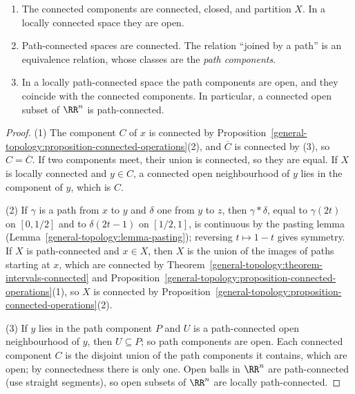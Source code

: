 \begin{proposition}\label{general-topology:proposition-components}
\begin{enumerate}
\item The connected components are connected, closed, and partition $X$. In a locally connected space they are open.
\item Path-connected spaces are connected. The relation ``joined by a path'' is an equivalence relation, whose classes are the \emph{path components}.
\item In a locally path-connected space the path components are open, and they coincide with the connected components. In particular, a connected
open subset of $\RR^n$ is path-connected.
\end{enumerate}
\end{proposition}

\begin{proof}
(1) The component $C$ of $x$ is connected by Proposition~\ref{general-topology:proposition-connected-operations}(2), and $\overline{C}$ is connected by
(3), so $C = \overline{C}$. If two components meet, their union is connected, so they are equal. If $X$ is locally connected and $y \in C$, a connected
open neighbourhood of $y$ lies in the component of $y$, which is $C$.

(2) If $\gamma$ is a path from $x$ to $y$ and $\delta$ one from $y$ to $z$, then $\gamma * \delta$, equal to $\gamma(2t)$ on $[0, 1/2]$ and to
$\delta(2t - 1)$ on $[1/2, 1]$, is continuous by the pasting lemma (Lemma~\ref{general-topology:lemma-pasting}); reversing $t \mapsto 1 - t$ gives
symmetry. If $X$ is path-connected and $x \in X$, then $X$ is the union of the images of paths starting at $x$, which are connected by
Theorem~\ref{general-topology:theorem-intervals-connected} and Proposition~\ref{general-topology:proposition-connected-operations}(1), so $X$ is
connected by Proposition~\ref{general-topology:proposition-connected-operations}(2).

(3) If $y$ lies in the path component $P$ and $U$ is a path-connected open neighbourhood of $y$, then $U \subseteq P$; so path components are open. Each
connected component $C$ is the disjoint union of the path components it contains, which are open; by connectedness there is only one. Open balls in
$\RR^n$ are path-connected (use straight segments), so open subsets of $\RR^n$ are locally path-connected.
\end{proof}


